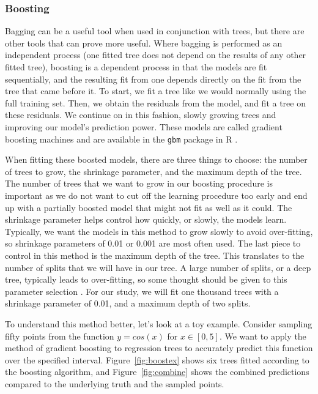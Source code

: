 \documentclass[12pt]{article}\usepackage[]{graphicx}\usepackage[]{color}
\begin{document}
\subsubsection{Boosting}
Bagging can be a useful tool when used in conjunction with trees, but there are other tools that can prove more useful. Where bagging is performed as an independent process (one fitted tree does not depend on the results of any other fitted tree), boosting is a dependent process in that the models are fit sequentially, and the resulting fit from one depends directly on the fit from the tree that came before it. To start, we fit a tree like we would normally using the full training set. Then, we obtain the residuals from the model, and fit a tree on these residuals. We continue on in this fashion, slowly growing trees and improving our model's prediction power. These models are called gradient boosting machines and are available in the \texttt{gbm} package in R \cite{gbm}.

When fitting these boosted models, there are three things to choose: the number of trees to grow, the shrinkage parameter, and the maximum depth of the tree. The number of trees that we want to grow in our boosting procedure is important as we do not want to cut off the learning procedure too early and end up with a partially boosted model that might not fit as well as it could. The shrinkage parameter helps control how quickly, or slowly, the models learn. Typically, we want the models in this method to grow slowly to avoid over-fitting, so shrinkage parameters of 0.01 or 0.001 are most often used. The last piece to control in this method is the maximum depth of the tree. This translates to the number of splits that we will have in our tree. A large number of splits, or a deep tree, typically leads to over-fitting, so some thought should be given to this parameter selection \cite{bag}. For our study, we will fit one thousand trees with a shrinkage parameter of 0.01, and a maximum depth of two splits.

To understand this method better, let's look at a toy example. Consider sampling fifty points from the function $y=cos(x)$ for $x \in [0,5]$. We want to apply the method of gradient boosting to regression trees to accurately predict this function over the specified interval. Figure~\ref{fig:boostex} shows six trees fitted according to the boosting algorithm, and Figure~\ref{fig:combine} shows the combined predictions compared to the underlying truth and the sampled points.
\end{document}
